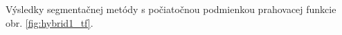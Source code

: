 \documentclass[a4paper,11pt,oneside]{article}%
\begin{document}
Výsledky segmentačnej metódy s počiatočnou podmienkou prahovacej funkcie obr. \ref{fig:hybrid1_tf}.

\begin{figure}[H]  
    \hspace{5px}

\end{figure}
\end{document}

